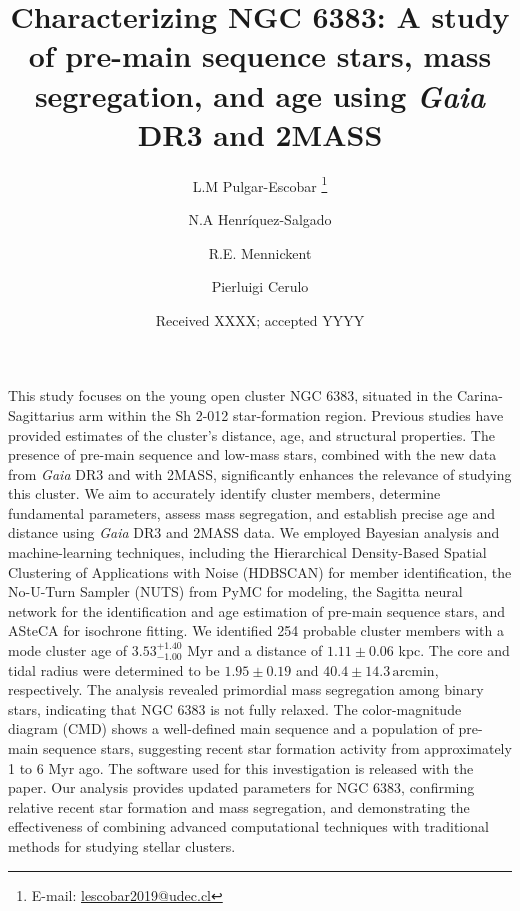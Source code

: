 \documentclass{aa}
\begin{document}
   \title{Characterizing NGC 6383: A study of pre-main sequence stars, mass segregation, and age using \textit{Gaia} DR3 and 2MASS}

   \author{L.M Pulgar-Escobar
          \thanks{E-mail: \href{mailto:lescobar2019@udec.cl}{lescobar2019@udec.cl}}
          \and
        N.A Henríquez-Salgado
        \and 
        R.E. Mennickent
        \and
        Pierluigi Cerulo
          }


   \date{Received XXXX; accepted YYYY}

  \abstract
   {This study focuses on the young open cluster NGC 6383, situated in the Carina-Sagittarius arm within the Sh 2-012 star-formation region. Previous studies have provided estimates of the cluster's distance, age, and structural properties. The presence of pre-main sequence and low-mass stars, combined with the new data from \textit{Gaia} DR3 and with 2MASS, significantly enhances the relevance of studying this cluster.}
   {We aim to accurately identify cluster members, determine fundamental parameters, assess mass segregation, and establish precise age and distance using \textit{Gaia} DR3 and 2MASS data.}
   {We employed Bayesian analysis and machine-learning techniques, including the Hierarchical Density-Based Spatial Clustering of Applications with Noise (HDBSCAN) for member identification, the No-U-Turn Sampler (NUTS) from PyMC for modeling, the Sagitta neural network for the identification and age estimation of pre-main sequence stars, and ASteCA for isochrone fitting.}   
   {We identified 254 probable cluster members with a mode cluster age of $3.53^{+1.40}_{-1.00}$ Myr and a distance of $1.11\pm 0.06$ kpc. The core and tidal radius were determined to be $1.95 \pm 0.19$ and $40.4 \pm 14.3\,\mathrm{arcmin}$, respectively. The analysis revealed primordial mass segregation among binary stars, indicating that NGC 6383 is not fully relaxed. The color-magnitude diagram (CMD) shows a well-defined main sequence and a population of pre-main sequence stars, suggesting recent star formation activity from approximately 1 to 6 Myr ago. The software used for this investigation is released with the paper.}
   {Our analysis provides updated parameters for NGC 6383, confirming relative recent star formation and mass segregation, and demonstrating the effectiveness of combining advanced computational techniques with traditional methods for studying stellar clusters.}
\end{document}
